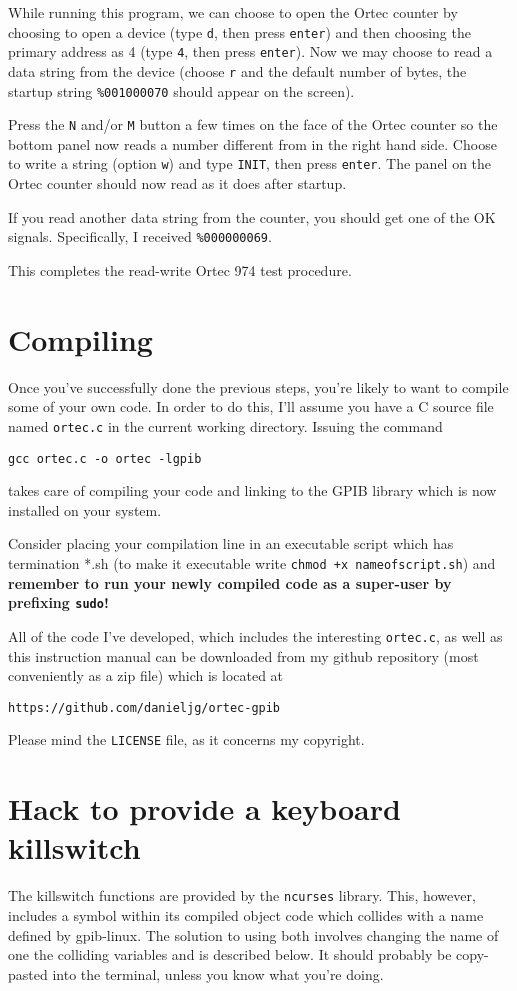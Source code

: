 \documentclass[letterpaper,11pt]{article}
\begin{document}
While running this program, we can choose to open the Ortec counter by choosing to open a device (type \texttt{d}, then press \texttt{enter}) and then choosing the primary address as 4 (type \texttt{4}, then press \texttt{enter}). Now we may choose to read a data string from the device (choose \texttt{r} and the default number of bytes, the startup string \texttt{\%001000070} should appear on the screen).

Press the \texttt{N} and/or \texttt{M} button a few times on the face of the Ortec counter so the bottom panel now reads a number different from  in the right hand side. Choose to write a string (option \texttt{w}) and type \texttt{INIT}, then press \texttt{enter}. The panel on the Ortec counter should now read  as it does after startup.

If you read another data string from the counter, you should get one of the OK signals. Specifically, I received \texttt{\%000000069}.

This completes the read-write Ortec 974 test procedure.

\section{Compiling}

Once you've successfully done the previous steps, you're likely to want to compile some of your own code. In order to do this, I'll assume you have a C source file named \texttt{ortec.c} in the current working directory. Issuing the command
\begin{verbatim}
gcc ortec.c -o ortec -lgpib
\end{verbatim}
takes care of compiling your code and linking to the GPIB library which is now installed on your system.

Consider placing your compilation line in an executable script which has termination *.sh (to make it executable write \texttt{chmod +x nameofscript.sh}) and \textbf{remember to run your newly compiled code as a super-user by prefixing \texttt{sudo}!}

All of the code I've developed, which includes the interesting \texttt{ortec.c}, as well as this instruction manual can be downloaded from my github repository (most conveniently as a zip file) which is located at
\begin{verbatim}
https://github.com/danieljg/ortec-gpib
\end{verbatim}
Please mind the \texttt{LICENSE} file, as it concerns my copyright.

\section{Hack to provide a keyboard killswitch}

The killswitch functions are provided by the \texttt{ncurses} library. This, however, includes a symbol within its compiled object code which collides with a name defined by gpib-linux. The solution to using both involves changing the name of one the colliding variables and is described below. It should probably be copy-pasted into the terminal, unless you know what you're doing.
\end{document}
